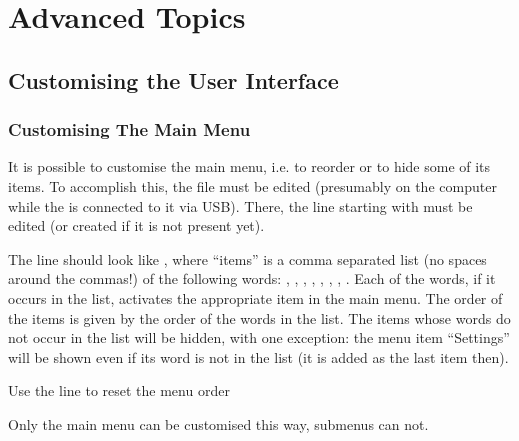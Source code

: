 \chapter{Advanced Topics}

\section{\label{ref:CustomisingUI}Customising the User Interface}

\subsection{\label{ref:CustomisingTheMainMenu}Customising The Main Menu}

It is possible to customise the main menu, i.e. to reorder or to hide some
of its items. To accomplish this, the file  must
be edited (presumably on the computer while the \dap{} is connected to it
via USB). There, the line starting with  must
be edited (or created if it is not present yet).

The line should look like , where ``items''
is a comma separated list (no spaces around the commas!) of the following
words: , , %
, , %
, ,
, .
Each of the words, if it occurs in the list, activates the appropriate item
in the main menu. The order of the items is given by the order of the words
in the list. The items whose words do not occur in the list will be hidden,
with one exception: the menu item ``Settings'' will be shown even if its word
is not in the list (it is added as the last item then).

Use the line  to reset the menu order

Only the main menu can be customised this way, submenus can not.



